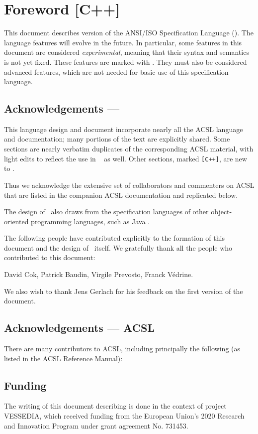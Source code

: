 \thispagestyle{plain}
\chapter*{Foreword [C++]}

This document describes version \acslppversion{}
of the ANSI/ISO \lang Specification Language (\NAME). 
The language features will evolve in the future. 
In particular, some features in this document
are considered \emph{experimental}, meaning that their syntax and
semantics is not yet fixed.  
These features are marked with
\experimental.  
They must also be considered advanced features,
which are not needed for basic use of this
specification language.

\section*{Acknowledgements --- \NAME}

This language design and document incorporate nearly all the 
ACSL language and documentation; many portions of the text
are explicitly shared. 
Some sections are nearly verbatim 
duplicates of the corresponding ACSL material, with light edits
to reflect the use in \NAME~ as well. 
Other sections, marked \texttt{[C++]}, are new to \NAME.

Thus we acknowledge the extensive
set of collaborators and commenters on ACSL that are listed
in the companion ACSL documentation and replicated below.

The design of \NAME~also draws from the specification
languages of other object-oriented programming languages,
such as Java \cite{leavens00jml}.

The following people have contributed explicitly to the formation of
this document and the design of \NAME~itself.
We gratefully thank all the people who contributed to this document:

David Cok,
Patrick Baudin,
Virgile Prevosto,
Franck Védrine.

We also wish to thank Jens Gerlach for his feedback on the first version
of the document.

\section*{Acknowledgements --- ACSL}
There are many contributors to ACSL, including principally the following
(as listed in the ACSL Reference Manual):


\section*{Funding}
The writing of this document describing \NAME is done in the context of
project VESSEDIA,
which  received funding from the European Union's 2020
Research and Innovation Program under grant agreement
No. 731453.

